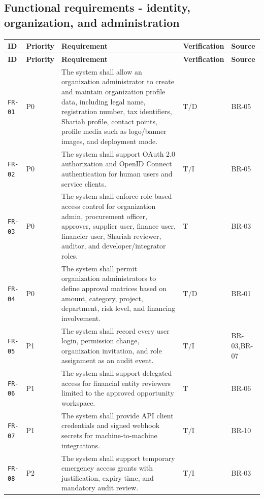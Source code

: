 \documentclass[11pt,a4paper]{article}
\begin{document}
\subsection{Functional requirements - identity, organization, and administration}\label{sec:fr-identity}
\begin{footnotesize}
\begin{longtable}{@{}p{}p{}p{}p{}p{}@{}}
\rowcolor{gray!18}\textbf{ID} & \textbf{Priority} & \textbf{Requirement} & \textbf{Verification} & \textbf{Source} \\ \hline
\endfirsthead
\rowcolor{gray!18}\textbf{ID} & \textbf{Priority} & \textbf{Requirement} & \textbf{Verification} & \textbf{Source} \\ \hline
\endhead
\texttt{FR-01} & P0 & The system shall allow an organization administrator to create and maintain organization profile data, including legal name, registration number, tax identifiers, Shariah profile, contact points, profile media such as logo/banner images, and deployment mode. & T/D & BR-05 \\ \hline
\texttt{FR-02} & P0 & The system shall support OAuth 2.0 authorization and OpenID Connect authentication for human users and service clients. & T/I & BR-05 \\ \hline
\texttt{FR-03} & P0 & The system shall enforce role-based access control for organization admin, procurement officer, approver, supplier user, finance user, financier user, Shariah reviewer, auditor, and developer/integrator roles. & T & BR-03 \\ \hline
\texttt{FR-04} & P0 & The system shall permit organization administrators to define approval matrices based on amount, category, project, department, risk level, and financing involvement. & T/D & BR-01 \\ \hline
\texttt{FR-05} & P1 & The system shall record every user login, permission change, organization invitation, and role assignment as an audit event. & T/I & BR-03,BR-07 \\ \hline
\texttt{FR-06} & P1 & The system shall support delegated access for financial entity reviewers limited to the approved opportunity workspace. & T & BR-06 \\ \hline
\texttt{FR-07} & P1 & The system shall provide API client credentials and signed webhook secrets for machine-to-machine integrations. & T/I & BR-10 \\ \hline
\texttt{FR-08} & P2 & The system shall support temporary emergency access grants with justification, expiry time, and mandatory audit review. & T/I & BR-03 \\ \hline
\end{longtable}
\end{footnotesize}
\end{document}
